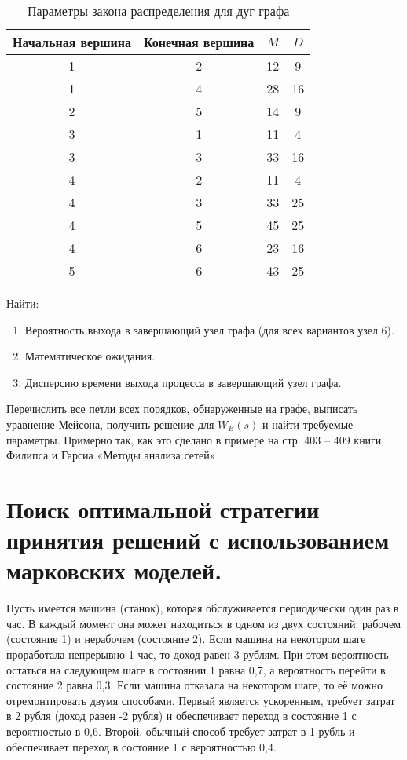 \documentclass[a4paper, 12pt]{article}		%
\begin{document}
\begin{table}[htb]
\centering
	\begin{tabular}{|c|c|c|c|}
	\hline 
	Начальная вершина & Конечная вершина & $M$ & $D$ \\ 
	\hline 
	1 & 2 & 12 & 9 \\ 
	\hline 
	1 & 4 & 28 & 16 \\ 
	\hline 
	2 & 5 & 14 & 9 \\ 
	\hline 
	3 & 1 & 11 & 4 \\ 
	\hline 
	3 & 3 & 33 & 16 \\ 
	\hline 
	4 & 2 & 11 & 4 \\ 
	\hline 
	4 & 3 & 33 & 25 \\ 
	\hline 
	4 & 5 & 45 & 25 \\ 
	\hline 
	4 & 6 & 23 & 16 \\ 
	\hline 
	5 & 6 & 43 & 25 \\ 
	\hline 
	\end{tabular} 
\caption{Параметры закона распределения для дуг графа}
\end{table}

Найти:
\begin{enumerate}
	\item Вероятность выхода в завершающий узел графа (для всех вариантов узел 6).
	\item Математическое ожидания.
	\item Дисперсию времени выхода процесса в завершающий узел графа.
\end{enumerate}

Перечислить все петли всех порядков, обнаруженные на графе, выписать уравнение Мейсона, получить решение для $W_E(s)$ и найти требуемые параметры. Примерно так, как это сделано в примере на стр. 403 -- 409 книги Филипса и Гарсиа «Методы анализа сетей»


\newpage
\section{Поиск оптимальной стратегии принятия решений с использованием марковских моделей.}

Пусть имеется машина (станок), которая обслуживается периодически один раз в час. В каждый момент она может находиться в одном из двух состояний: рабочем (состояние 1) и нерабочем (состояние 2). Если машина на некотором шаге проработала непрерывно 1 час, то доход равен 3 рублям. При этом вероятность остаться на следующем шаге в состоянии 1 равна 0,7, а вероятность перейти в состояние 2 равна 0,3. Если машина отказала на некотором шаге, то её можно отремонтировать двумя способами. Первый является ускоренным, требует затрат в 2 рубля (доход равен -2 рубля) и обеспечивает переход в состояние 1 с вероятностью в 0,6. Второй, обычный способ требует затрат в 1 рубль и обеспечивает переход в состояние 1 с вероятностью 0,4.
\end{document}

